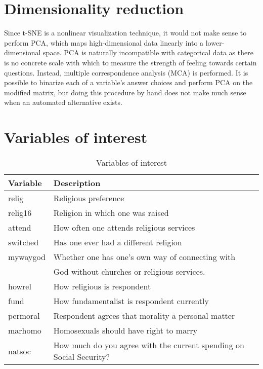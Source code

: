 \documentclass{article}
\begin{document}
	\section{Dimensionality reduction}
	Since t-SNE is a nonlinear visualization technique, it would not make sense to perform PCA, which maps high-dimensional data linearly into a lower-dimensional space. PCA is naturally incompatible with categorical data as there is no concrete scale with which to measure the strength of feeling towards certain questions. Instead, multiple correspondence analysis (MCA) is performed. It is possible to binarize each of a variable's answer choices and perform PCA on the modified matrix, but doing this procedure by hand does not make much sense when an automated alternative exists.

	\section{Variables of interest}

	
	
	\begin{table}[h]
		\caption{Variables of interest}
		\label{gss-vars}
		\centering
		\begin{tabular}{lll}
			\toprule
			Variable     & Description  \\
			\midrule
			relig & Religious preference \\
			relig16 & Religion in which one was raised \\ 
			attend & How often one attends religious services \\
			switched & Has one ever had a different religion \\
			mywaygod & Whether one has one's own way of connecting with \\
				     & God without churches or religious services. \\
			howrel & How religious is respondent \\
			fund & How fundamentalist is respondent currently \\
			permoral & Respondent agrees that morality a personal matter \\
			marhomo & Homosexuals should have right to marry \\
			natsoc & How much do you agree with the current spending on Social Security? \\
			\bottomrule
		\end{tabular}
	\end{table}
	
\end{document}
